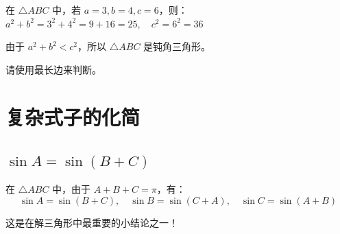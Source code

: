 \begin{example}
    在 $\triangle ABC$ 中，若 $a=3, b=4, c=6$，则：
    $a^2+b^2 = 3^2+4^2 = 9+16 = 25, \quad c^2 = 6^2 = 36$

    由于 $a^2+b^2 < c^2$，所以 $\triangle ABC$ 是钝角三角形。
\end{example}

\begin{tips}
    请使用最长边来判断。
\end{tips}

\section{复杂式子的化简}

\subsection{$\sin A = \sin(B+C)$}

\begin{theorem}
    在 $\triangle ABC$ 中，由于 $A+B+C=\pi$，有：
    $$\sin A = \sin(B+C), \quad \sin B = \sin(C+A), \quad \sin C = \sin(A+B)$$

    \begin{warning}
        这是在解三角形中最重要的小结论之一！
    \end{warning}
\end{theorem}










